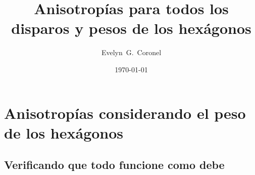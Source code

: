 



\title{Anisotropías para todos los disparos y pesos de los hexágonos}
\author{Evelyn~G.~Coronel}


\date[]{\lowercase{\today}} %


\maketitle

%



\section{Anisotropías  considerando el peso de los hexágonos}

\subsection{Verificando que todo funcione como debe}



